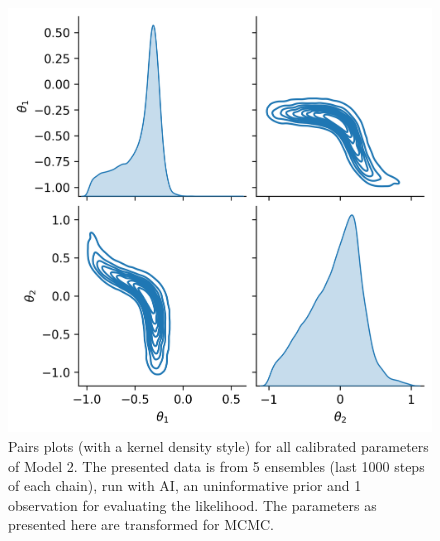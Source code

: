 \begin{figure}[ht]
\centering
\includegraphics[width=1.0\linewidth]{Figures/appendix_figs/kde_model2_Stretch.png}
\caption{Pairs plots (with a kernel density style) for all calibrated parameters of Model 2. The presented data is from 5 ensembles (last 1000 steps of each chain), run with AI, an uninformative prior and 1 observation for evaluating the likelihood. The parameters as presented here are transformed for MCMC.}\label{fig_kde_model2_AI}
\end{figure}



